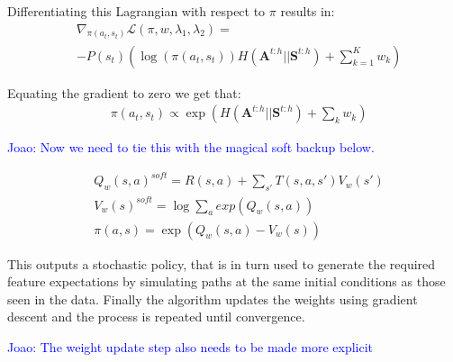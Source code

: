 \documentclass[letterpaper]{article}
\newcommand{\jm}[1]{\textcolor{blue}{Joao: #1}}
\newcommand{\jm}[1]{}
\begin{document}
Differentiating this Lagrangian with respect to $\pi$ results in:
\begin{equation}
 \begin{split}
 &\nabla_{\pi(a_t,s_t)}\mathcal{L}(\pi,w,\lambda_1,\lambda_2) =  \\
&- P(s_{t}) \left(\log(\pi(a_t,s_t))H(\mathbf{A}^{t:h}||\mathbf{S}^{t:h})
 +\sum_{k=1}^K w_k \right) \label{eqn:zieb_lagragian_derivative}
 \end{split}
\end{equation}

Equating the gradient to zero we get that:
\begin{equation}
	\begin{split}
	&\pi(a_t,s_t) \propto \exp\left(H(\mathbf{A}^{t:h}||\mathbf{S}^{t:h})+\sum_k w_k\right)
	\end{split}
\end{equation}

\jm{Now we need to tie this with the magical soft backup below.}


	\begin{equation}
		\begin{split}
	&Q_w(s,a)^{soft} = R(s,a) + \sum_{s'}T(s,a,s')V_w(s')\\	
	&V_w(s)^{soft} = \log\sum_{a}exp(Q_w(s,a))\\
	&\pi(a,s) = \exp(Q_w(s,a) - V_w(s))
	\end{split}
	\end{equation}

 This outputs a stochastic policy, that is in turn used to generate the required feature expectations by simulating paths at the same initial conditions as those seen in the data. Finally the algorithm updates the weights using gradient descent and the process is repeated until convergence.

\jm{The weight update step also needs to be made more explicit}
\end{document}
